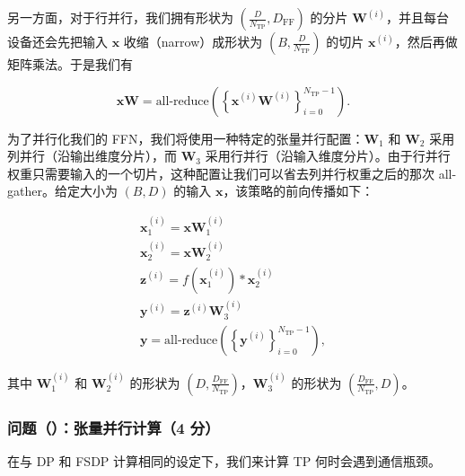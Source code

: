 另一方面，对于行并行，我们拥有形状为 $\left(\frac{D}{N_{\mathrm{TP}}},D_{\mathrm{FF}}\right)$ 的分片 $\boldsymbol{W}^{(i)}$，并且每台设备还会先把输入 $\boldsymbol{x}$ 收缩（narrow）成形状为 $\left(B,\frac{D}{N_{\mathrm{TP}}}\right)$ 的切片 $\boldsymbol{x}^{(i)}$，然后再做矩阵乘法。于是我们有

\begin{equation}
\boldsymbol{x}\boldsymbol{W} = \text{all-reduce}\left(\left\{\boldsymbol{x}^{(i)}\boldsymbol{W}^{(i)}\right\}_{i=0}^{N_{\mathrm{TP}}-1}\right).
\tag{46}
\end{equation}

为了并行化我们的 FFN，我们将使用一种特定的张量并行配置：$\boldsymbol{W}_1$ 和 $\boldsymbol{W}_2$ 采用列并行（沿输出维度分片），而 $\boldsymbol{W}_3$ 采用行并行（沿输入维度分片）。由于行并行权重只需要输入的一个切片，这种配置让我们可以省去列并行权重之后的那次 all-gather。给定大小为 $(B,D)$ 的输入 $\boldsymbol{x}$，该策略的前向传播如下：

\begin{gather}
\boldsymbol{x}_1^{(i)} = \boldsymbol{x}\boldsymbol{W}_1^{(i)} \tag{47}\\
\boldsymbol{x}_2^{(i)} = \boldsymbol{x}\boldsymbol{W}_2^{(i)} \tag{48}\\
\boldsymbol{z}^{(i)} = f\left(\boldsymbol{x}_1^{(i)}\right) * \boldsymbol{x}_2^{(i)} \tag{49}\\
\boldsymbol{y}^{(i)} = \boldsymbol{z}^{(i)}\boldsymbol{W}_3^{(i)} \tag{50}\\
\boldsymbol{y} = \text{all-reduce}\left(\left\{\boldsymbol{y}^{(i)}\right\}_{i=0}^{N_{\mathrm{TP}}-1}\right), \tag{51}
\end{gather}

其中 $\boldsymbol{W}_1^{(i)}$ 和 $\boldsymbol{W}_2^{(i)}$ 的形状为 $\left(D,\frac{D_{\mathrm{FF}}}{N_{\mathrm{TP}}}\right)$，$\boldsymbol{W}_3^{(i)}$ 的形状为 $\left(\frac{D_{\mathrm{FF}}}{N_{\mathrm{TP}}},D\right)$。

\subsubsection*{问题（）：张量并行计算（4 分）}

在与 DP 和 FSDP 计算相同的设定下，我们来计算 TP 何时会遇到通信瓶颈。

